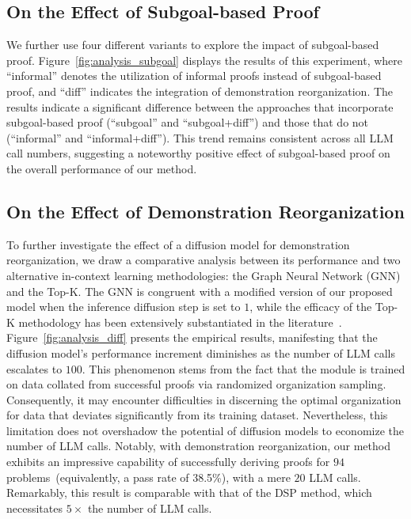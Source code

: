 \documentclass{article}
\begin{document}
\subsection{On the Effect of Subgoal-based Proof}
\label{sec:analysis_subgoal}

We further use four different variants to explore the impact of subgoal-based proof. Figure~\ref{fig:analysis_subgoal} displays the results of this experiment, where ``informal'' denotes the utilization of informal proofs instead of subgoal-based proof, and ``diff'' indicates the integration of demonstration reorganization. The results indicate a significant difference between the approaches that incorporate subgoal-based proof (``subgoal'' and ``subgoal+diff'') and those that do not (``informal'' and ``informal+diff''). This trend remains consistent across all LLM call numbers, suggesting a noteworthy positive effect of subgoal-based proof on the overall performance of our method. 

\subsection{On the Effect of Demonstration Reorganization}
\label{sec:analysis_diff}
To further investigate the effect of a diffusion model for demonstration reorganization, we draw a comparative analysis between its performance and two alternative in-context learning methodologies: the Graph Neural Network (GNN) and the Top-K. The GNN is congruent with a modified version of our proposed model when the inference diffusion step is set to $1$, while the efficacy of the Top-K methodology has been extensively substantiated in the literature~\cite{liu2021makes}.
Figure~\ref{fig:analysis_diff} presents the empirical results, manifesting that the diffusion model's performance increment diminishes as the number of LLM calls escalates to $100$. This phenomenon stems from the fact that the module is trained on data collated from successful proofs via randomized organization sampling. Consequently, it may encounter difficulties in discerning the optimal organization for data that deviates significantly from its training dataset. Nevertheless, this limitation does not overshadow the potential of diffusion models to economize the number of LLM calls.
Notably, with demonstration reorganization, our method exhibits an impressive capability of successfully deriving proofs for $94$ problems~(equivalently, a pass rate of 38.5\%), with a mere $20$ LLM calls. Remarkably, this result is comparable with that of the DSP method, which necessitates $5\times$ the number of LLM calls.
\end{document}
